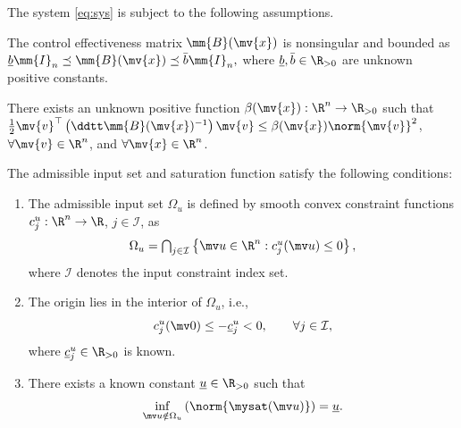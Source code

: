 \documentclass[letterpaper, journal, twoside]{IEEEtran}
\begin{document}
The system \eqref{eq:sys} is subject to the following assumptions.

\begin{assum} \label{assum:B:bound}
  The control effectiveness matrix $\mm{B}(\mv{x})$ is nonsingular and bounded as   
  $
    \underline{b}\mm{I}_n
    \preceq 
    \mm{B}(\mv{x})
    \preceq 
    \bar{b}\mm{I}_n
    ,
  $
  where $\underline{b},\bar{b}\in\R_{>0}$ are unknown positive constants.
\end{assum}

\begin{assum} \label{assum:B:bound:grad}
  There exists an unknown positive function $\beta(\mv{x}):\R^n\to\R_{>0}$ such that $\tfrac{1}{2}\mv{v}^\top\left(\ddtt\mm{B}(\mv{x})^{-1}\right)\mv{v} \le \beta(\mv{x})\norm{\mv{v}}^2$, $\forall \mv{v}\in\R^n$, and $\forall \mv{x}\in\R^n$. 
\end{assum}

\begin{assum} \label{assum:sat}
  The admissible input set and saturation function satisfy the following
  conditions:
  \begin{enumerate}
    \item
    The admissible input set $\Omega_u$ is defined by smooth convex
    constraint functions $c_j^u:\R^n\to\R$, $j\in\mathcal I$, as
    \begin{equation*}
      \Omega_u
      =
      \textstyle
      \bigcap_{j\in\mathcal I}
      \left\{
        \mv u\in\R^n:
        c_j^u(\mv u)\le 0
      \right\}
      ,
    \end{equation*}
    where $\mathcal I$ denotes the input constraint index set.

    \item
    The origin lies in the interior of $\Omega_u$, i.e.,
    \begin{equation*}
      c_j^u(\mv 0)
      \le
      -\underline c_j^u
      <
      0
      ,
      \qquad
      \forall j\in\mathcal I
      ,
    \end{equation*}
    where $\underline c_j^u\in\R_{>0}$ is known.

    \item
    There exists a known constant $\underline u\in\R_{>0}$ such that
    \begin{equation*}
      \inf_{\mv u\notin\Omega_u}
      \left(
        \norm{\mysat(\mv u)}
      \right)
      =
      \underline u
      .
    \end{equation*}
  \end{enumerate}
\end{assum}
\end{document}
